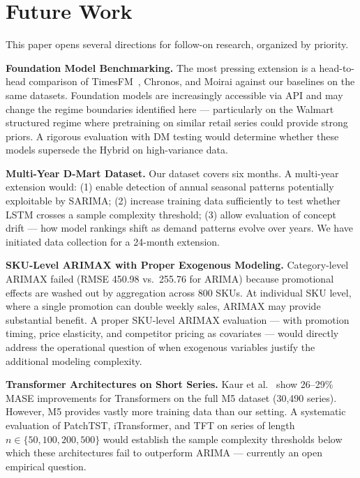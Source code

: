 \documentclass[journal]{IEEEtran}
\begin{document}
\section{Future Work}
\label{sec:future}

This paper opens several directions for follow-on research, organized by priority.

\textbf{Foundation Model Benchmarking.}
The most pressing extension is a head-to-head comparison of TimesFM~\cite{ekambaram2024ttm}, Chronos, and Moirai against our baselines on the same datasets. Foundation models are increasingly accessible via API and may change the regime boundaries identified here — particularly on the Walmart structured regime where pretraining on similar retail series could provide strong priors. A rigorous evaluation with DM testing would determine whether these models supersede the Hybrid on high-variance data.

\textbf{Multi-Year D-Mart Dataset.}
Our dataset covers six months. A multi-year extension would: (1) enable detection of annual seasonal patterns potentially exploitable by SARIMA; (2) increase training data sufficiently to test whether LSTM crosses a sample complexity threshold; (3) allow evaluation of concept drift — how model rankings shift as demand patterns evolve over years. We have initiated data collection for a 24-month extension.

\textbf{SKU-Level ARIMAX with Proper Exogenous Modeling.}
Category-level ARIMAX failed (RMSE 450.98 vs.\ 255.76 for ARIMA) because promotional effects are washed out by aggregation across 800 SKUs. At individual SKU level, where a single promotion can double weekly sales, ARIMAX may provide substantial benefit. A proper SKU-level ARIMAX evaluation — with promotion timing, price elasticity, and competitor pricing as covariates — would directly address the operational question of when exogenous variables justify the additional modeling complexity.

\textbf{Transformer Architectures on Short Series.}
Kaur et al.~\cite{kaur2024transformer} show 26--29\% MASE improvements for Transformers on the full M5 dataset (30,490 series). However, M5 provides vastly more training data than our setting. A systematic evaluation of PatchTST, iTransformer, and TFT on series of length $n \in \{50, 100, 200, 500\}$ would establish the sample complexity thresholds below which these architectures fail to outperform ARIMA — currently an open empirical question.
\end{document}
